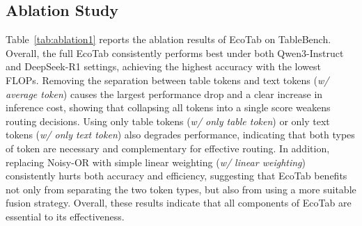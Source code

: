 \documentclass[11pt]{article}
\begin{document}




\subsection{Ablation Study}
\label{sec5.3}
Table~\ref{tab:ablation1} reports the ablation results of EcoTab on TableBench. Overall, the full EcoTab consistently performs best under both Qwen3-Instruct and DeepSeek-R1 settings, achieving the highest accuracy with the lowest FLOPs. Removing the separation between table tokens and text tokens (\emph{w/ average token}) causes the largest performance drop and a clear increase in inference cost, showing that collapsing all tokens into a single score weakens routing decisions. Using only table tokens (\emph{w/ only table token}) or only text tokens (\emph{w/ only text token}) also degrades performance, indicating that both types of token are necessary and complementary for effective routing. In addition, replacing Noisy-OR with simple linear weighting (\emph{w/ linear weighting}) consistently hurts both accuracy and efficiency, suggesting that EcoTab benefits not only from separating the two token types, but also from using a more suitable fusion strategy. Overall, these results indicate that all components of EcoTab are essential to its effectiveness.
\end{document}
